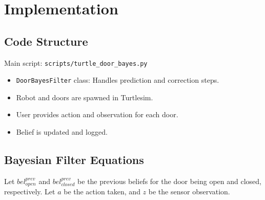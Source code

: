 \documentclass[12pt]{article}
\begin{document}
\section{Implementation}
\subsection{Code Structure}
Main script: \texttt{scripts/turtle_door_bayes.py}
\begin{itemize}
  \item \texttt{DoorBayesFilter} class: Handles prediction and correction steps.
  \item Robot and doors are spawned in Turtlesim.
  \item User provides action and observation for each door.
  \item Belief is updated and logged.
\end{itemize}
\subsection{Bayesian Filter Equations}
Let $bel_{open}^{prev}$ and $bel_{closed}^{prev}$ be the previous beliefs for the door being open and closed, respectively. Let $a$ be the action taken, and $z$ be the sensor observation.
\end{document}
